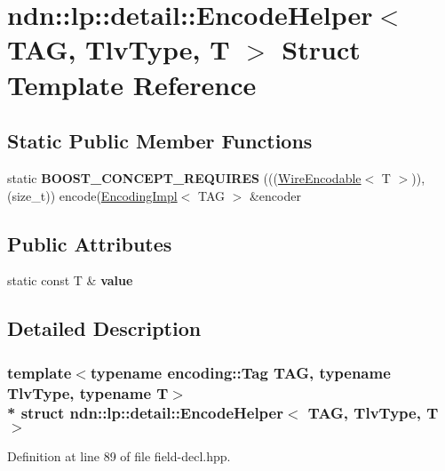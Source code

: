 \hypertarget{structndn_1_1lp_1_1detail_1_1EncodeHelper}{}\section{ndn\+:\+:lp\+:\+:detail\+:\+:Encode\+Helper$<$ T\+AG, Tlv\+Type, T $>$ Struct Template Reference}
\label{structndn_1_1lp_1_1detail_1_1EncodeHelper}
\subsection*{Static Public Member Functions}
\begin{DoxyCompactItemize}
\item 
static {\bfseries B\+O\+O\+S\+T\+\_\+\+C\+O\+N\+C\+E\+P\+T\+\_\+\+R\+E\+Q\+U\+I\+R\+ES} (((\hyperlink{classndn_1_1WireEncodable}{Wire\+Encodable}$<$ T $>$)),(size\+\_\+t)) encode(\hyperlink{classndn_1_1encoding_1_1EncodingImpl}{Encoding\+Impl}$<$ T\+AG $>$ \&encoder\hypertarget{structndn_1_1lp_1_1detail_1_1EncodeHelper_a2e2df8aaec644de1aaa5f515cb5ca51e}{}\label{structndn_1_1lp_1_1detail_1_1EncodeHelper_a2e2df8aaec644de1aaa5f515cb5ca51e}

\end{DoxyCompactItemize}
\subsection*{Public Attributes}
\begin{DoxyCompactItemize}
\item 
static const T \& {\bfseries value}
\end{DoxyCompactItemize}


\subsection{Detailed Description}
\subsubsection*{template$<$typename encoding\+::\+Tag T\+AG, typename Tlv\+Type, typename T$>$\\*
struct ndn\+::lp\+::detail\+::\+Encode\+Helper$<$ T\+A\+G, Tlv\+Type, T $>$}



Definition at line 89 of file field-\/decl.\+hpp.



